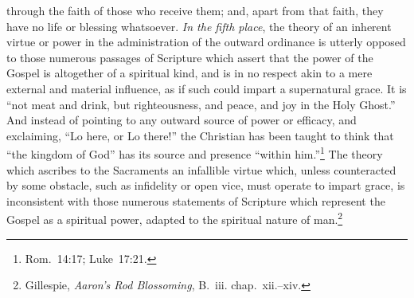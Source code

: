 \documentclass[
  english,
]{book}
\begin{document}
through the faith of those who receive them; and, apart from that faith, they have no life or blessing whatsoever. \emph{In the fifth place}, the theory of an inherent virtue or power in the administration of the outward ordinance is utterly opposed to those numerous passages of Scripture which assert that the power of the Gospel is altogether of a spiritual kind, and is in no respect akin to a mere external and material influence, as if such could impart a supernatural grace. It is ``not meat and drink, but righteousness, and peace, and joy in the Holy Ghost.'' And instead of pointing to any outward source of power or efficacy, and exclaiming, ``Lo here, or Lo there!'' the Christian has been taught to think that ``the kingdom of God'' has its source and presence ``within him.''\footnote{Rom.~14:17; Luke~17:21.} The theory which ascribes to the Sacraments an infallible virtue which, unless counteracted by some obstacle, such as infidelity or open vice, must operate to impart grace, is inconsistent with those numerous statements of Scripture which represent the Gospel as a spiritual power, adapted to the spiritual nature of man.\footnote{Gillespie, \emph{Aaron's Rod Blossoming}, B.~iii. chap.~xii.--xiv.}
\end{document}
